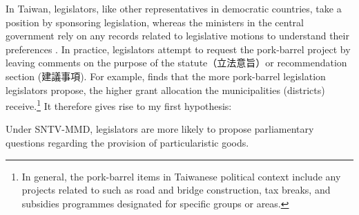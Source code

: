 In Taiwan, legislators, like other representatives in democratic countries, take a position by sponsoring legislation, whereas the ministers in the central government rely on any records related to legislative motions to understand their preferences \citep{Luor2008}. In practice, legislators attempt to request the pork-barrel project by leaving comments on the purpose of the statute（立法意旨）or recommendation section (建議事項). For example, \citet{Luor2009} finds that the more pork-barrel legislation legislators propose, the higher grant allocation the municipalities (districts) receive.\footnote{In general, the pork-barrel items in Taiwanese political context include any projects related to such as road and bridge construction, tax breaks, and subsidies programmes designated for specific groups or areas.} It therefore gives rise to my first hypothesis:


\begin{hyp}
Under SNTV-MMD, legislators are more likely to propose parliamentary questions regarding the provision of particularistic goods.
\label{h:h1} 
\end{hyp}






